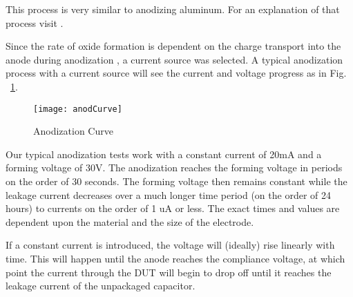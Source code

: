 This process is very similar to anodizing aluminum. For an explanation of that process visit \cite{cwruEncAlanod}.

Since the rate of oxide formation is dependent on the charge transport into the anode during anodization \cite{tiMinit}, a current source was selected. A typical anodization process with a current source will see the current and voltage progress as in Fig. ~\ref{fig:anodCurve}.


\begin{figure}[here]
\centering
\texttt{[image: anodCurve]}
\caption{Anodization Curve \cite{tiMinit}}
\label{fig:anodCurve}
\end{figure}

Our typical anodization tests work with a constant current of 20mA and a forming voltage of 30V. The anodization reaches the forming voltage in periods on the order of 30 seconds. The forming voltage then remains constant while the leakage current decreases over  a much longer time period (on the order of 24 hours) to currents on the order of 1 uA or less. The exact times and values are dependent upon the material and the size of the electrode.

If a constant current is introduced, the voltage will (ideally) rise linearly with time. This will happen until the anode reaches the compliance voltage, at which point the current through the DUT will begin to drop off until it reaches the leakage current of the unpackaged capacitor. 
